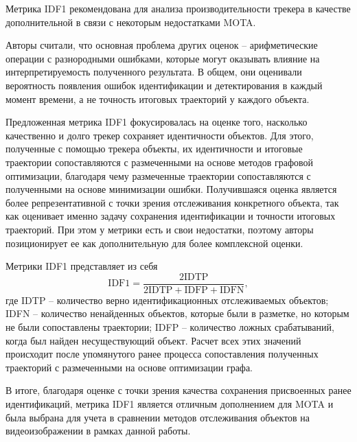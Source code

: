 Метрика IDF1 \cite{ristani2016performance} рекомендована для анализа производительности трекера в качестве дополнительной в связи с некоторым недостатками MOTA.

Авторы считали, что основная проблема других оценок -- арифметические операции с разнородными ошибками, которые могут оказывать влияние на интерпретируемость полученного результата. В общем, они оценивали вероятность появления ошибок идентификации и детектирования в каждый момент времени, а не точность итоговых траекторий у каждого объекта. 

Предложенная метрика IDF1 фокусировалась на оценке того, насколько качественно и долго трекер сохраняет идентичности объектов. Для этого, полученные с помощью трекера объекты, их идентичности и итоговые траектории сопоставляются с размеченными на основе методов графовой оптимизации, благодаря чему размеченные траектории сопоставляются с полученными на основе минимизации ошибки. Получившаяся оценка является более репрезентативной с точки зрения отслеживания конкретного объекта, так как оценивает именно задачу сохранения идентификации и точности итоговых траекторий.  
При этом у метрики есть и свои недостатки, поэтому авторы позиционирует ее как дополнительную для более комплексной оценки. 

Метрики IDF1 представляет из себя
\begin{equation}
    \label{eq:idf1}
    \text{IDF1} = \frac{2 \text{IDTP}}{2\text{IDTP} + \text{IDFP} + \text{IDFN}},
\end{equation}
где IDTP -- количество верно идентификационных отслеживаемых объектов; IDFN -- количество ненайденных объектов, которые были в разметке, но которым не были сопоставлены траектории; IDFP -- количество ложных срабатываний, когда был найден несуществующий объект. 
Расчет всех этих значений происходит после упомянутого ранее процесса сопоставления полученных траекторий с размеченными на основе оптимизации графа. 


В итоге, благодаря оценке с точки зрения качества сохранения присвоенных ранее идентификаций, метрика IDF1 является отличным дополнением для MOTA и была выбрана для учета в сравнении методов отслеживания объектов на видеоизображении в рамках данной работы.